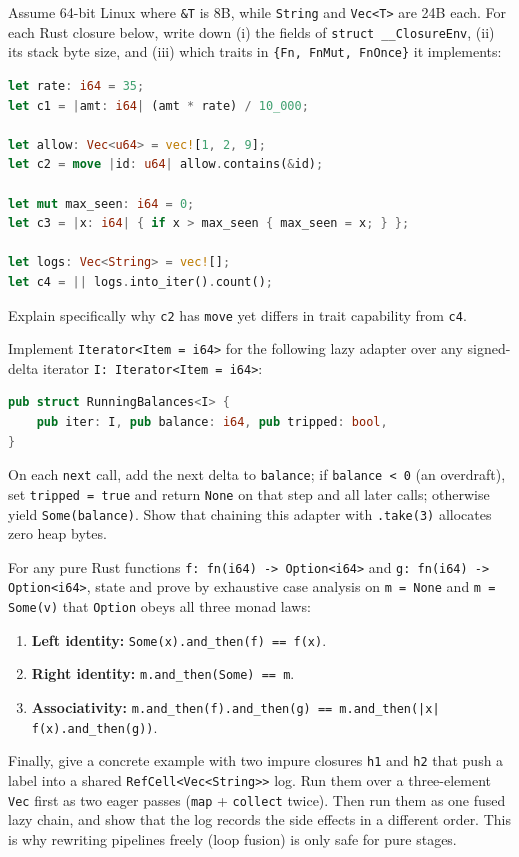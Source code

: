\begin{exercise}
Assume 64-bit Linux where \texttt{\&T} is 8B, while \texttt{String} and \texttt{Vec<T>} are 24B each. For each Rust closure below, write down (i) the fields of \texttt{struct \_\_ClosureEnv}, (ii) its stack byte size, and (iii) which traits in \texttt{\{Fn, FnMut, FnOnce\}} it implements:
\begin{lstlisting}[language=Rust]
let rate: i64 = 35;
let c1 = |amt: i64| (amt * rate) / 10_000;

let allow: Vec<u64> = vec![1, 2, 9];
let c2 = move |id: u64| allow.contains(&id);

let mut max_seen: i64 = 0;
let c3 = |x: i64| { if x > max_seen { max_seen = x; } };

let logs: Vec<String> = vec![];
let c4 = || logs.into_iter().count();
\end{lstlisting}
Explain specifically why \texttt{c2} has \texttt{move} yet differs in trait capability
from \texttt{c4}.
\end{exercise}

\begin{exercise}
Implement \texttt{Iterator<Item = i64>} for the following lazy adapter over any
signed-delta iterator \texttt{I: Iterator<Item = i64>}:
\begin{lstlisting}[language=Rust]
pub struct RunningBalances<I> {
    pub iter: I, pub balance: i64, pub tripped: bool,
}
\end{lstlisting}
On each \texttt{next} call, add the next delta to \texttt{balance}; if \texttt{balance < 0}
(an overdraft), set \texttt{tripped = true} and return \texttt{None} on that step and all
later calls; otherwise yield \texttt{Some(balance)}. Show that chaining this adapter
with \texttt{.take(3)} allocates zero heap bytes.
\end{exercise}

\begin{exercise}
For any pure Rust functions \texttt{f: fn(i64) -> Option<i64>} and
\texttt{g: fn(i64) -> Option<i64>}, state and prove by exhaustive case analysis on
\texttt{m = None} and \texttt{m = Some(v)} that \texttt{Option} obeys all three monad
laws:
\begin{enumerate}
  \item \textbf{Left identity:} \texttt{Some(x).and\_then(f) == f(x)}.
  \item \textbf{Right identity:} \texttt{m.and\_then(Some) == m}.
  \item \textbf{Associativity:} \texttt{m.and\_then(f).and\_then(g) == m.and\_then(|x| f(x).and\_then(g))}.
\end{enumerate}
Finally, give a concrete example with two impure closures \texttt{h1} and \texttt{h2}
that push a label into a shared \texttt{RefCell<Vec<String>>} log. Run them over a three-element \texttt{Vec} first as two eager passes (\texttt{map} + \texttt{collect} twice). Then run them as one fused lazy chain, and show that the log records the side effects in a different order. This is why rewriting pipelines freely (loop fusion) is only safe for pure
stages.
\end{exercise}
